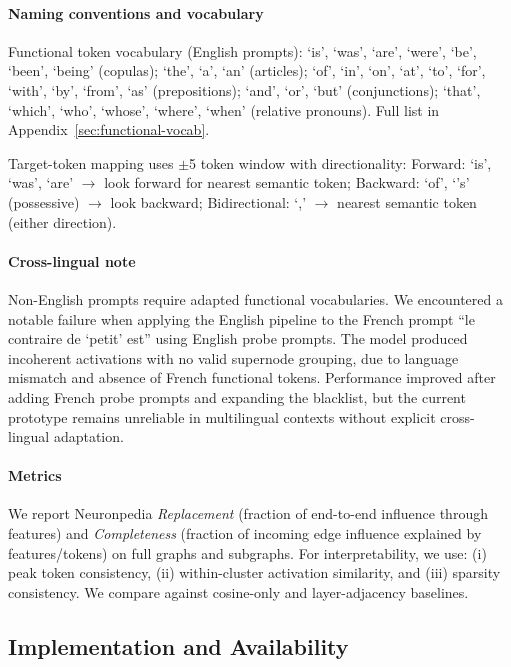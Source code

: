 \paragraph{Naming conventions and vocabulary}
Functional token vocabulary (English prompts): `is', `was', `are', `were', `be', `been', `being' (copulas); `the', `a', `an' (articles); `of', `in', `on', `at', `to', `for', `with', `by', `from', `as' (prepositions); `and', `or', `but' (conjunctions); `that', `which', `who', `whose', `where', `when' (relative pronouns). Full list in Appendix~\ref{sec:functional-vocab}.

Target-token mapping uses $\pm$5 token window with directionality: Forward: `is', `was', `are' $\rightarrow$ look forward for nearest semantic token; Backward: `of', `'s' (possessive) $\rightarrow$ look backward; Bidirectional: `,' $\rightarrow$ nearest semantic token (either direction).

\paragraph{Cross-lingual note}
Non-English prompts require adapted functional vocabularies. We encountered a notable failure when applying the English pipeline to the French prompt ``le contraire de `petit' est'' using English probe prompts. The model produced incoherent activations with no valid supernode grouping, due to language mismatch and absence of French functional tokens. Performance improved after adding French probe prompts and expanding the blacklist, but the current prototype remains unreliable in multilingual contexts without explicit cross-lingual adaptation.

\paragraph{Metrics}
We report Neuronpedia \emph{Replacement} (fraction of end-to-end influence through features) and \emph{Completeness} (fraction of incoming edge influence explained by features/tokens) on full graphs and subgraphs. For interpretability, we use: (i) peak token consistency, (ii) within-cluster activation similarity, and (iii) sparsity consistency. We compare against cosine-only and layer-adjacency baselines.

\subsection{Implementation and Availability}

